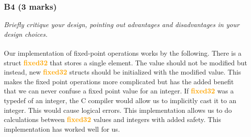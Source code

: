 \documentclass{report}
\newcommand{\question}[1]{\textit{#1} \\ }
\newcommand{\struct}[1]{\textcolor{orange}{\textbf{#1}}}
\begin{document}
            \subsubsection*{B4  (3 marks)}
                \question{Briefly critique your design, pointing out advantages and disadvantages in your design choices.}
                \\ Our implementation of fixed-point operations works by the following. There is a struct \struct{fixed32} 
                that stores a single element. The value should not be modified but instead, new \struct{fixed32} structs 
                should be initialized with the modified value. This makes the fixed point operations more complicated 
                but has the added benefit that we can never confuse a fixed point value for an integer. If \struct{fixed32} 
                was a typedef of an integer, the C compiler would allow us to implicitly cast it to an integer. This would 
                cause logical errors. This implementation allows us to do calculations between \struct{fixed32} values 
                and integers with added safety. This implementation has worked well for us.
                
\end{document}
